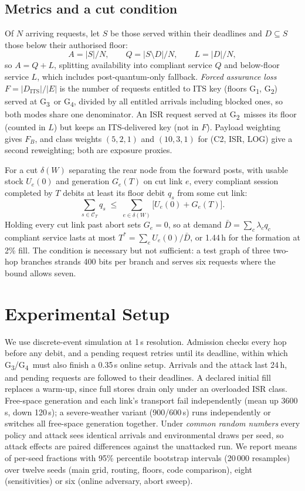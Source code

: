 \documentclass[conference,a4paper]{IEEEtran}
\newcommand{\GI}{G\textsubscript{1}}
\newcommand{\GII}{G\textsubscript{2}}
\newcommand{\GIII}{G\textsubscript{3}}
\newcommand{\GIV}{G\textsubscript{4}}
\begin{document}
\subsection{Metrics and a cut condition}\label{sec:metrics}
Of $N$ arriving requests, let $S$ be those served within their deadlines and $D\subseteq S$ those below their authorised floor:
\begin{equation}\label{eq:metrics}
A=|S|/N,\qquad Q=|S\setminus D|/N,\qquad L=|D|/N,
\end{equation}
so $A=Q+L$, splitting availability into compliant service $Q$ and below-floor service
$L$, which includes post-quantum-only fallback. \emph{Forced assurance loss}
$F=|D_{\mathrm{ITS}}|/|E|$ is the number of requests entitled to ITS key (floors \GI,
\GII) served at \GIII\ or \GIV, divided by all entitled arrivals including blocked
ones, so both modes share one denominator. An ISR request served at \GII\ misses its
floor (counted in $L$) but keeps an ITS-delivered key (not in $F$). Payload weighting
gives $F_B$, and class weights $(5,2,1)$ and $(10,3,1)$ for (C2, ISR, LOG) give a
second reweighting; both are exposure proxies.

For a cut $\delta(W)$ separating the rear node from the forward posts, with usable
stock $U_e(0)$ and generation $G_e(T)$ on cut link $e$, every compliant session
completed by $T$ debits at least its floor debit $q_s$ from some cut link:
\begin{equation}\label{eq:cut}
\textstyle\sum_{s\in\mathcal{C}_T} q_s\;\le\;\sum_{e\in\delta(W)}\bigl[U_e(0)+G_e(T)\bigr].
\end{equation}
Holding every cut link past abort sets $G_e=0$, so at demand $\bar D=\sum_c\lambda_cq_c$
compliant service lasts at most $T^\ast=\sum_eU_e(0)/\bar D$, or 1.44\,h for the
formation at 2\% fill. The condition is necessary but not sufficient: a test graph of
three two-hop branches strands 400 bits per branch and serves six requests where the
bound allows seven.

\section{Experimental Setup}\label{sec:setup}
We use discrete-event simulation at 1\,s resolution. Admission checks every hop before any debit, and a pending request retries until its deadline, within which \GIII/\GIV\ must also finish a 0.35\,s online setup. Arrivals and the attack last 24\,h, and pending requests are followed to their deadlines. A declared initial fill replaces
a warm-up, since full stores drain only under an overloaded ISR class. Free-space
generation and each link's transport fail independently (mean up 3600\,s, down
120\,s); a severe-weather variant (900/600\,s) runs independently or switches all
free-space generation together. Under \emph{common random numbers} every policy and
attack sees identical arrivals and environmental draws per seed, so attack effects are
paired differences against the unattacked run. We report means of per-seed fractions
with 95\% percentile bootstrap intervals (20\,000 resamples) over twelve seeds (main
grid, routing, floors, code comparison), eight (sensitivities) or six (online
adversary, abort sweep).
\end{document}
